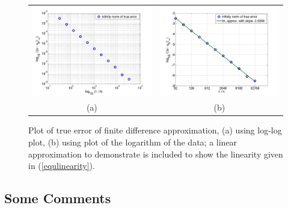 \documentclass[12pt]{article}
\numberwithin{equation}{section}
\numberwithin{table}{section}
\numberwithin{figure}{section}
\newlength{\fwtwo} \setlength{\fwtwo}{0.45\textwidth}
\begin{document}
\begin{figure} \centering
  \begin{tabular}{cc}
    \includegraphics[width=\fwtwo]{figconvrateloglog} &
    \includegraphics[width=\fwtwo]{figconvrateplot} \\
    (a) & (b)
  \end{tabular}
  \caption{Plot of true error of finite difference approximation,
  (a) using log-log plot, (b) using plot of the logarithm of the data;
  a linear approximation to demonstrate is included to show the linearity
  given in (\ref{equlinearity}).}
  \label{figconvrateab}
\end{figure}

\subsection{Some Comments}
\end{document}
